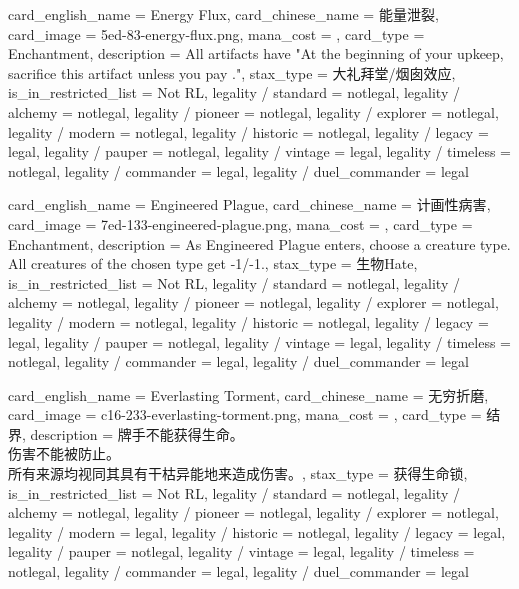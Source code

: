 \documentclass[lang = cn, color = black, 10pt]{AllThatStax}
\begin{document}
\card
{
	card_english_name = {Energy Flux},
	card_chinese_name = {能量泄裂},
	card_image = 5ed-83-energy-flux.png,
	mana_cost = ,
	card_type = Enchantment,
	description = {All artifacts have "At the beginning of your upkeep, sacrifice this artifact unless you pay ."},
	stax_type = 大礼拜堂/烟囱效应,
	is_in_restricted_list = Not RL,
	legality / standard = notlegal,
	legality / alchemy = notlegal,
	legality / pioneer = notlegal,
	legality / explorer = notlegal,
	legality / modern = notlegal,
	legality / historic = notlegal,
	legality / legacy = legal,
	legality / pauper = notlegal,
	legality / vintage = legal,
	legality / timeless = notlegal,
	legality / commander = legal,
	legality / duel_commander = legal
}

\card
{
	card_english_name = {Engineered Plague},
	card_chinese_name = {计画性病害},
	card_image = 7ed-133-engineered-plague.png,
	mana_cost = ,
	card_type = Enchantment,
	description = {As Engineered Plague enters, choose a creature type.\\
		All creatures of the chosen type get -1/-1.},
	stax_type = 生物Hate,
	is_in_restricted_list = Not RL,
	legality / standard = notlegal,
	legality / alchemy = notlegal,
	legality / pioneer = notlegal,
	legality / explorer = notlegal,
	legality / modern = notlegal,
	legality / historic = notlegal,
	legality / legacy = legal,
	legality / pauper = notlegal,
	legality / vintage = legal,
	legality / timeless = notlegal,
	legality / commander = legal,
	legality / duel_commander = legal
}

\card
{
	card_english_name = {Everlasting Torment},
	card_chinese_name = {无穷折磨},
	card_image = c16-233-everlasting-torment.png,
	mana_cost = ,
	card_type = 结界,
	description = {牌手不能获得生命。\\
		伤害不能被防止。\\
		所有来源均视同其具有干枯异能地来造成伤害。},
	stax_type = 获得生命锁,
	is_in_restricted_list = Not RL,
	legality / standard = notlegal,
	legality / alchemy = notlegal,
	legality / pioneer = notlegal,
	legality / explorer = notlegal,
	legality / modern = legal,
	legality / historic = notlegal,
	legality / legacy = legal,
	legality / pauper = notlegal,
	legality / vintage = legal,
	legality / timeless = notlegal,
	legality / commander = legal,
	legality / duel_commander = legal
}
\end{document}
